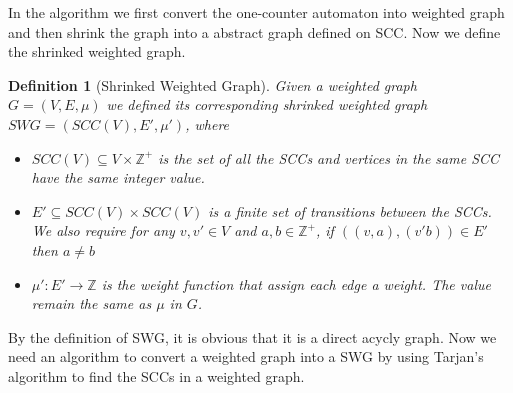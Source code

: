 \documentclass{article}
\newtheorem{definition}{Definition}
\begin{document}
In the algorithm we first convert the one-counter automaton into weighted graph and then shrink the graph into a abstract graph defined on SCC. Now we define the shrinked weighted graph.

\begin{definition}[Shrinked Weighted Graph]
Given a weighted graph $G = (V, E, \mu)$ we defined its corresponding shrinked weighted graph $SWG = (SCC(V), E', \mu')$, where
\begin{itemize}
\item $SCC(V) \subseteq V\times \mathbb{Z}^+$ is the set of all the SCCs and vertices in the same SCC have the same integer value.

\item $E'\subseteq SCC(V) \times SCC(V)$ is a finite set of transitions between the SCCs. We also require for any $v,v'\in V$ and $a,b \in \mathbb{Z}^+$, if $((v,a), (v'b)) \in E'$ then $a \ne b$

\item $\mu': E' \rightarrow \mathbb{Z}$ is the weight function that assign each edge a weight. The value remain the same as $\mu$ in $G$.
\end{itemize}

\end{definition}

By the definition of SWG, it is obvious that it is a direct acycly graph. Now we need an algorithm to convert a weighted graph into a SWG by using Tarjan's algorithm to find the SCCs in a weighted graph.
\end{document}
